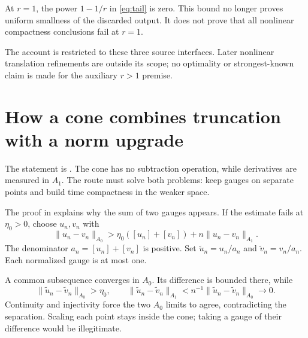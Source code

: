 \documentclass[12pt,reqno]{amsart}
\begin{document}
At $r=1$, the power $1-1/r$ in \eqref{eq:tail} is zero. This bound no longer proves uniform smallness of the discarded output. It does not prove that all nonlinear compactness conclusions fail at $r=1$.

The account is restricted to these three source interfaces. Later nonlinear translation refinements are outside its scope; no optimality or strongest-known claim is made for the auxiliary $r>1$ premise.

\section{How a cone combines truncation with a norm upgrade}

\begin{theorem}\label{thm:cone}

\end{theorem}

The statement is \cite[Theorem 1, pp.~3--4]{S-barrett-suli}. The cone has no subtraction operation, while derivatives are measured in $A_1$. The route must solve both problems: keep gauges on separate points and build time compactness in the weaker space.

\begin{lemma}\label{lem:ehrling}

\end{lemma}

The proof in \cite[Lemma 1, pp.~4--5]{S-barrett-suli} explains why the sum of two gauges appears. If the estimate fails at $\eta_0>0$, choose $u_n,v_n$ with
\[
\|u_n-v_n\|_{A_0}>
\eta_0([u_n]+[v_n])+n\|u_n-v_n\|_{A_1}.
\]
The denominator $a_n=[u_n]+[v_n]$ is positive. Set $\widetilde u_n=u_n/a_n$ and $\widetilde v_n=v_n/a_n$. Each normalized gauge is at most one.

A common subsequence converges in $A_0$. Its difference is bounded there, while
\[
\|\widetilde u_n-\widetilde v_n\|_{A_0}>\eta_0,
\qquad
\|\widetilde u_n-\widetilde v_n\|_{A_1}
<n^{-1}\|\widetilde u_n-\widetilde v_n\|_{A_0}\longrightarrow0.
\]
Continuity and injectivity force the two $A_0$ limits to agree, contradicting the separation. Scaling each point stays inside the cone; taking a gauge of their difference would be illegitimate.
\end{document}
